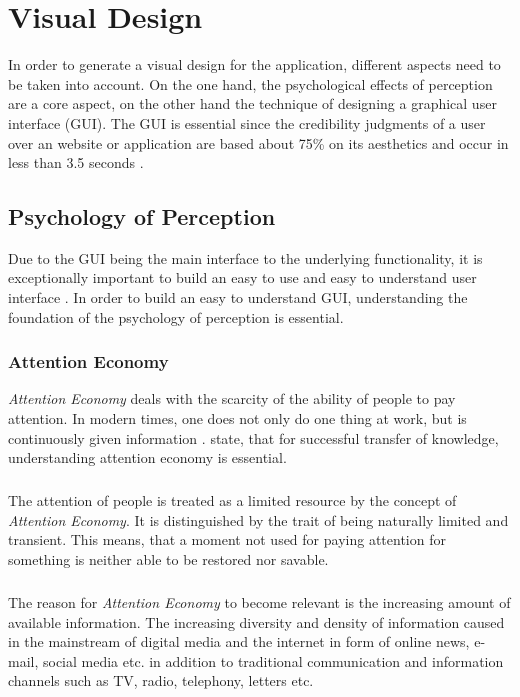 \chapter{Visual Design}
In order to generate a visual design for the application, different aspects need to be taken into account. On the one hand, the psychological effects of perception are a core aspect, on the other hand the technique of designing a graphical user interface (GUI). The GUI is essential since the credibility judgments of a user over an website or application are based about 75\% on its aesthetics and occur in less than 3.5 seconds \parencite[cf.][1]{Alsudani.2009}.
\section{Psychology of Perception}
Due to the GUI being the main interface to the underlying functionality, it is exceptionally important to build an easy to use and easy to understand user interface \parencite[cf.][2]{Dray.1995}. In order to build an easy to understand GUI, understanding the foundation of the psychology of perception is essential.
\subsection{Attention Economy}
\textit{Attention Economy} deals with the scarcity of the ability of people to pay attention. In modern times, one does not only do one thing at work, but is continuously given information  \parencite[cf.][]{Davenport.2001}. \textcite{Davenport.2001} state, that for successful transfer of knowledge, understanding attention economy is essential. 
\paragraph*{} The attention of people is treated as a limited resource by the concept of \textit{Attention Economy}. It is distinguished by the trait of being naturally limited and transient. This means, that a moment not used for paying attention for something is neither able to be restored nor savable. \parencite[cf.][]{Davenport.2001}
\paragraph*{} The reason for \textit{Attention Economy} to become relevant is the increasing amount of available information. The increasing diversity and density of information caused in the mainstream of digital media and the internet in form of online news, e-mail, social media etc. in addition to traditional communication and information channels such as TV, radio, telephony, letters etc.

